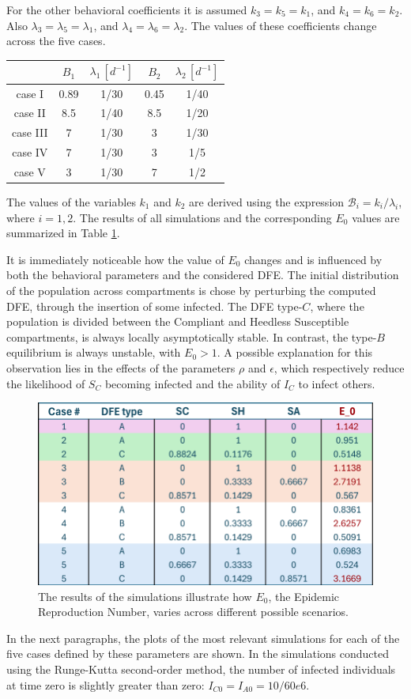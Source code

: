 For the other behavioral coefficients it is assumed $k_3 = k_5 = k_1$, and $k_4 = k_6 = k_2$. Also $\lambda_3 = \lambda_5 = \lambda_1$, and  $\lambda_4 = \lambda_6 = \lambda_2$. 
The values of these coefficients change across the five cases.
\begin{center}
 \begin{tabular}{|c|c|c|c|c|}
 	\hline
 	& $B_1$ & $\lambda_1 \,[d^{-1}]$ & $B_2$ & $\lambda_2 \, [d^{-1}]$ \\
 	\hline
 	case I & 0.89 & 1/30 & 0.45 & 1/40 \\
 	\hline
 	case II & 8.5 & 1/40 & 8.5 & 1/20 \\
 	\hline
 	case III & 7 & 1/30 & 3 & 1/30 \\
 	\hline
 	case IV & 7 & 1/30 & 3 & 1/5 \\
 	\hline
 	case V & 3 & 1/30 & 7 & 1/2 \\
 	\hline
 \end{tabular}
\end{center}
The values of the variables $k_1$ and $k_2$ are derived using the expression $\mathcal{B}_i = k_i/\lambda_i$, where $i = 1, 2$.
The results of all simulations and the corresponding $E_0$ values are summarized in Table \ref{fig:valori-dfe-e-e0caso3}.

It is immediately noticeable how the value of $E_0$ changes and is influenced by both the behavioral parameters and the considered DFE.  The initial distribution of the population across compartments is chose by perturbing the computed DFE, through the insertion of some infected. The DFE type-$C$, where the population is divided between the Compliant and Heedless Susceptible compartments, is always locally asymptotically stable. In contrast, the type-$B$ equilibrium is always unstable, with $E_0>1$. A possible explanation for this observation lies in the effects of the parameters $\rho$ and $\epsilon$, which respectively reduce the likelihood of $S_C$ becoming infected and the ability of $I_C$ to infect others.
\begin{figure}[h]
	\centering
	\includegraphics[width=0.6\linewidth]{"1_corpo/figure/Valori DFE e E_0_caso_3"}
	\caption[$E_0$ simulation results]{The results of the simulations illustrate how $E_0$, the Epidemic Reproduction Number, varies across different possible scenarios.}
	\label{fig:valori-dfe-e-e0caso3}
\end{figure}
In the next paragraphs, the plots of the most relevant simulations for each of the five cases defined by these parameters are shown. In the simulations conducted using the Runge-Kutta second-order method, the number of infected individuals at time zero is slightly greater than zero: $I_{C0}= I_{A0} = 10/60e6$.


